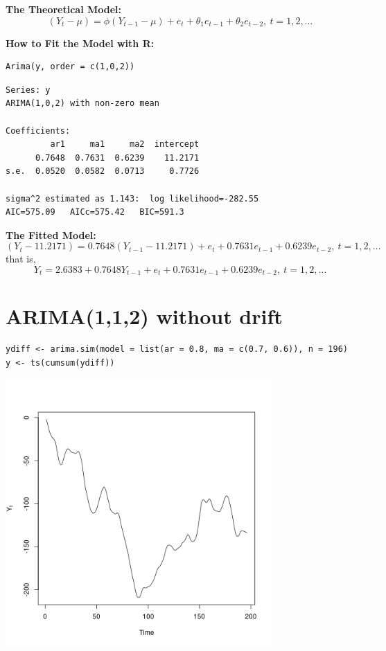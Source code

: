 \documentclass[12pt]{article}
\begin{document}
\noindent
\textbf{The Theoretical Model:} 
\[
(Y_{t} - \mu) = \phi(Y_{t - 1} - \mu) +  e_{t} + \theta_{1} e_{t - 1} + \theta_{2} e_{t - 2},\ t = 1,2,\ldots
\]

\noindent
\textbf{How to Fit the Model with R:}


\begin{verbatim}
Arima(y, order = c(1,0,2))
\end{verbatim}




\begin{verbatim}
Series: y 
ARIMA(1,0,2) with non-zero mean 

Coefficients:
         ar1     ma1     ma2  intercept
      0.7648  0.7631  0.6239    11.2171
s.e.  0.0520  0.0582  0.0713     0.7726

sigma^2 estimated as 1.143:  log likelihood=-282.55
AIC=575.09   AICc=575.42   BIC=591.3
\end{verbatim}

\noindent
\textbf{The Fitted Model:} 
\[
(Y_{t} -  11.2171 ) =  0.7648 (Y_{t - 1} -  11.2171 ) + e_{t} +  0.7631 e_{t - 1} +  0.6239 e_{t - 2},\ t = 1,2,\ldots
\]
that is,
\[
Y_{t} =  2.6383 +  0.7648 Y_{t - 1} + e_{t} +  0.7631 e_{t - 1} +  0.6239 e_{t - 2},\ t = 1,2,\ldots
\]
\section*{ARIMA(1,1,2) without drift}
\label{sec-7}


\begin{verbatim}
ydiff <- arima.sim(model = list(ar = 0.8, ma = c(0.7, 0.6)), n = 196)
y <- ts(cumsum(ydiff))
\end{verbatim}





\includegraphics[width=4.0in]{img/arima112zm.png}
\end{document}

